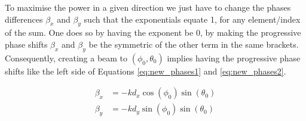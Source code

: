 To maximise the power in a given direction we just have to change the phases differences $\beta_x$ and $\beta_y$ such that the exponentials equate 1, for any element/index of the sum. One does so by having the exponent be 0, by making the progressive phase shifts $\beta_x$ and $\beta_y$ be the symmetric of the other term in the same brackets. Consequently, creating a beam to $(\phi_0, \theta_0)$ implies having the progressive phase shifts like the left side of Equations \eqref{eq:new_phases1} and \eqref{eq:new_phases2}.

\begin{subequations}
    \begin{align}
        \beta_x &= -k d_x \cos(\phi_0) \sin(\theta_0) \label{eq:new_phases1} \\
        \beta_y &= -k d_y \sin(\phi_0) \sin(\theta_0) \label{eq:new_phases2}
    \end{align}
\end{subequations}


\begin{comment}
When beam steering in a planar array, having the correct angular references facilitates the computations down the line tremendously. As such, our new angular reference is the array axis, i.e. the axis orthogonal to the plane where the array belongs (in Figure \ref{fig:af_img} the z-axis is orthogonal to the xOy plane). Then we define relative azimuth $\phi_r$ and relative elevation $\theta_r$ as the angles required to rotate the array clockwise around the x-axis and y-axis, respectively, in order to have the array axis in the direction of the supposed maximum. This results in changes both in the $AF$ and in the progressive phase shifts $\beta_x$ and $\beta_y$, but to compute the steering vector we require only the latter. Therefore, the right side of Equations \eqref{eq:new_phases1} and \eqref{eq:new_phases2} contains the phases with adapted references. 

\begin{subequations}
    \begin{align}
        \beta_x = -k d_x \cos(\phi_0) \sin(\theta_0) & = -k d_x \sin({\phi_r}_0) \cos({\theta_r}_0) \label{eq:new_phases1} \\
        \beta_y = -k d_y \sin(\phi_0) \sin(\theta_0) & = k d_y\cos({\phi_r}_0) \cos({\theta_r}_0)\label{eq:new_phases2}
    \end{align}
\end{subequations}



Note that this adaptation is beneficial not only to facilitate the mathematics for ourselves, but to better integrate our work with the formulations of the community since we could not find a formulation with the elevation and azimuth references along boresight. Such formulation should always be used in cases where the antenna physical orientation matters as it provides a base for computing a gain based in a relative direction.
\end{comment}



